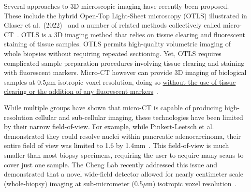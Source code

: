 \documentclass{NIHGrant}
\theoremstyle{theorem}
\begin{document}
Several approaches to 3D microscopic imaging have recently been proposed.
These include the hybrid Open-Top Light-Sheet microscopy (OTLS) illustrated in
Glaser et al.~(2022)~\cite{glaser_hybrid_2022} and a number of related methods collectively called
micro-CT~\cite{katsamenis_x-ray_2019,topperwien_contrast_2019,frost_3d_2023,cheng_whole-animal_2011,ding_computational_2019}. OTLS is a 3D imaging method that relies on tissue clearing and fluorescent staining of tissue samples. OTLS permits high-quality
volumetric imaging of whole biopsies without requiring repeated sectioning.
Yet, OTLS requires complicated sample preparation procedures involving tissue clearing and staining with fluorescent markers. Micro-CT however can provide 3D imaging of biological samples at 0.5$\mu$m isotropic voxel resolution, doing so \uline{without the use of tissue clearing or the addition of any fluorescent markers}~\cite{pinkert-leetsch_three-dimensional_2023,yakovlev_wide-field_2022,ding_computational_2019,topperwien_correlative_2020}.

While multiple groups have shown that micro-CT is capable of producing
high-resolution cellular and sub-cellular imaging, these technologies have
been limited by their narrow field-of-view. For example, while Pinkert-Leetsch et al.
demonstrated they could resolve nuclei within pancreatic adenocarcinoma, their entire field of view was limited to 1.6 by 1.4mm~\cite{pinkert-leetsch_three-dimensional_2023}. This field-of-view is much smaller than most biopsy specimens, requiring the user to acquire many scans to cover just one sample. The Cheng Lab
recently addressed this issue and demonstrated that a novel wide-field
detector allowed for nearly centimeter scale (whole-biopsy) imaging at sub-micrometer (0.5$\mu$m) isotropic voxel
resolution~\cite{yakovlev_wide-field_2022}.
\end{document}
